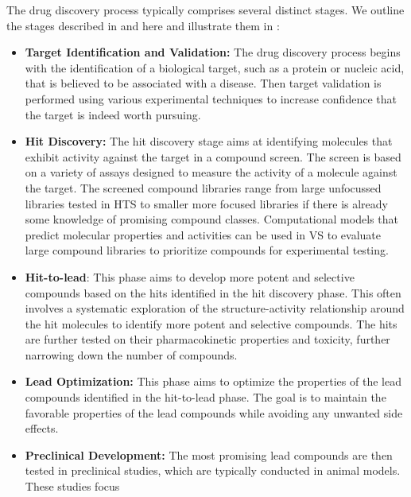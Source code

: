 The drug discovery process typically comprises several distinct stages. We outline the stages
described in \citet{hughesPrinciplesEarlyDrug2011} and \citep{umscheidKeyConceptsClinical2011} here and illustrate them in :
\begin{itemize}
      \item \textbf{Target Identification and Validation:} The drug discovery process begins with
            the identification of a biological target, such as a protein or nucleic acid, that is
            believed to be associated with a disease. Then target validation is performed using
            various experimental techniques to increase confidence that the target is indeed worth
            pursuing.
      \item \textbf{Hit Discovery:} The hit discovery stage aims at identifying molecules that
            exhibit activity against the target in a compound screen. The screen is based on a
            variety of assays designed to measure the activity of a molecule against the target. The
            screened compound libraries range from large unfocussed libraries tested in \ac{HTS} to
            smaller more focused libraries if there is already some knowledge of promising compound
            classes. Computational models that predict molecular properties and activities can be
            used in \ac{VS} \citep{waltersVirtualScreeningOverview1998,shoichetVirtualScreeningChemical2004a} to evaluate large compound libraries to prioritize compounds for
            experimental testing.
      \item \textbf{Hit-to-lead}: This phase aims to develop more potent and selective compounds
            based on the hits identified in the hit discovery phase. This often involves a
            systematic exploration of the structure-activity relationship around the hit molecules
            to identify more potent and selective compounds. The hits are further tested on their
            pharmacokinetic properties and toxicity, further narrowing down the number of compounds.
      \item \textbf{Lead Optimization:} This phase aims to optimize the properties of the
            lead compounds identified in the hit-to-lead phase. The goal is to maintain the favorable
            properties of the lead compounds while avoiding any unwanted side effects.
      \item \textbf{Preclinical Development:} The most promising lead compounds are then tested in
            preclinical studies, which are typically conducted in animal models. These studies focus

\end{itemize}
